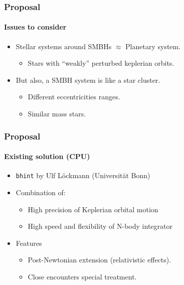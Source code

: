 \begin{frame}
    \frametitle{Proposal}
    \framesubtitle{Issues to consider}

    \begin{itemize}
        \item Stellar systems around SMBHs $\approx$ Planetary system.
        \begin{itemize}
            \item Stars with ``weakly'' perturbed keplerian orbits.
        \end{itemize}
        \item But also, a SMBH system is like a star cluster.
        \begin{itemize}
            \item Different eccentricities ranges.
            \item Similar mass stars.
        \end{itemize}
    \end{itemize}
\end{frame}


\begin{frame}
    \frametitle{Proposal}
    \framesubtitle{Existing solution (CPU)}
    \begin{itemize}
        \item \texttt{bhint} by Ulf Löckmann (Universität Bonn)
        \item Combination of:
        \begin{itemize}
            \item High precision of Keplerian orbital motion
            \item High speed and flexibility of N-body integrator
        \end{itemize}
        \item Features
        \begin{itemize}
            \item Post-Newtonian extension (relativistic effects).
            \item Close encounters special treatment.
        \end{itemize}
    \end{itemize}
\end{frame}

